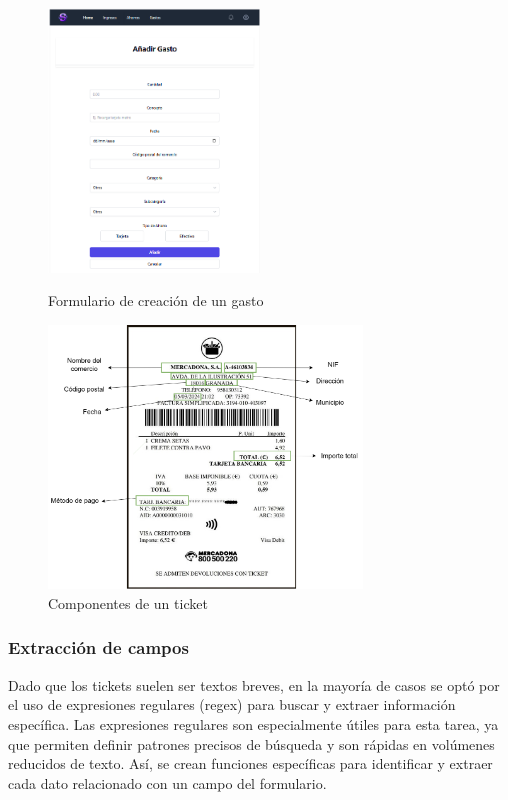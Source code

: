 \begin{figure}[ht!]
    \centering
    \begin{minipage}{0.45\textwidth}
        \centering
        \includegraphics[height = 70mm]{imagenes/formulario_gasto.png}
        \caption{Formulario de creación de un gasto}
        \label{fig:formulario_gasto}
    \end{minipage}\hfill
    \begin{minipage}{0.45\textwidth}
        \centering
        \includegraphics[height = 70mm]{imagenes/componentes_ticket.png}
        \caption{Componentes de un ticket}
        \label{fig:componentes_ticket}
    \end{minipage}
\end{figure}

\subsubsection{Extracción de campos}
Dado que los tickets suelen ser textos breves, en la mayoría de casos se optó por el uso de expresiones regulares (regex) para buscar y extraer información específica. Las expresiones regulares son especialmente útiles para esta tarea, ya que permiten definir patrones precisos de búsqueda y son rápidas en volúmenes reducidos de texto. Así, se crean funciones específicas para identificar y extraer cada dato relacionado con un campo del formulario.

